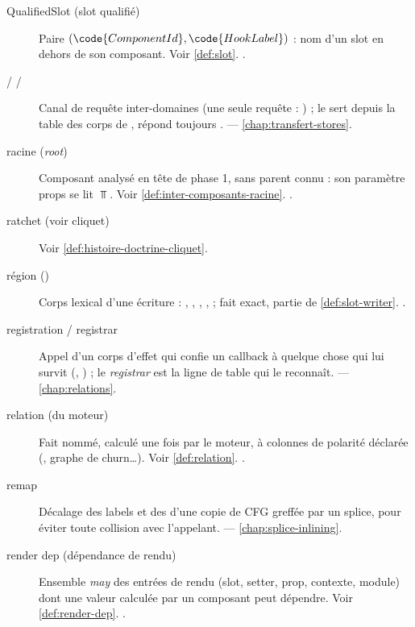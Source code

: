 \begin{description}
\item[QualifiedSlot (slot qualifié)] Paire \((\code{ComponentId}, \code{HookLabel})\) : nom d'un slot en dehors de son composant. Voir \cref{def:slot}. .

\item[ /  / ] Canal de requête inter-domaines (une seule requête : ) ;  le sert depuis la table des corps de ,  répond toujours .  — \cref{chap:transfert-stores}.

\item[racine (\emph{root})] Composant analysé en tête de phase 1, sans parent connu : son paramètre props se lit \(\Top\). Voir \cref{def:inter-composants-racine}. .

\item[ratchet (voir cliquet)] Voir \cref{def:histoire-doctrine-cliquet}.

\item[région ()] Corps lexical d'une écriture : , , , ,  ; fait exact, partie de \cref{def:slot-writer}. .

\item[registration / registrar] Appel d'un corps d'effet qui confie un callback à quelque chose qui lui survit (, ) ; le \emph{registrar} est la ligne de table qui le reconnaît.  — \cref{chap:relations}.

\item[relation (du moteur)] Fait nommé, calculé une fois par le moteur, à colonnes de polarité déclarée (, graphe de churn\ldots). Voir \cref{def:relation}. .

\item[remap] Décalage des labels et des  d'une copie de CFG greffée par un splice, pour éviter toute collision avec l'appelant.  — \cref{chap:splice-inlining}.

\item[render dep (dépendance de rendu)] Ensemble \emph{may} des entrées de rendu (slot, setter, prop, contexte, module) dont une valeur calculée par un composant peut dépendre. Voir \cref{def:render-dep}. .


\end{description}
